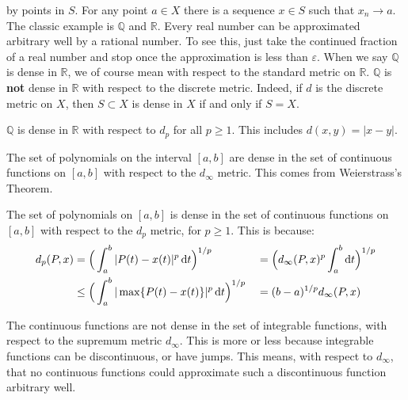         by points in $S$. For any point $a\in{X}$
        there is a sequence $x\in{S}$
        such that $x_{n}\rightarrow{a}$. The
        classic example is $\mathbb{Q}$ and
        $\mathbb{R}$. Every real number can be
        approximated arbitrary well by a rational
        number. To see this, just take the continued
        fraction of a real number and stop once
        the approximation is less than
        $\varepsilon$. When we say $\mathbb{Q}$ is
        dense in $\mathbb{R}$, we of course mean with
        respect to the standard metric on $\mathbb{R}$.
        $\mathbb{Q}$ is \textbf{not} dense in
        $\mathbb{R}$ with respect to the discrete metric.
        Indeed, if $d$ is the discrete metric on $X$,
        then $S\subset{X}$ is dense in $X$ if and only if
        $S=X$.
        \begin{example}
            $\mathbb{Q}$ is dense in $\mathbb{R}$
            with respect to $d_{p}$ for all
            $p\geq{1}$. This includes
            $d(x,y)=|x-y|$.
        \end{example}
        \begin{example}
            The set of polynomials on the interval
            $[a,b]$ are dense in the set of
            continuous functions on $[a,b]$ with
            respect to the $d_{\infty}$ metric.
            This comes from Weierstrass's Theorem.
        \end{example}
        \begin{example}
            The set of polynomials on $[a,b]$
            is dense in the set of continuous
            functions on $[a,b]$ with respect to
            the $d_{p}$ metric, for $p\geq{1}$. This
            is because:
            \begin{align*}
                d_{p}(P,x)&=
                \Big(
                    \int_{a}^{b}|P(t)-x(t)|^{p}\mathop{}\!\mathrm{d}{t}
                \Big)^{1/p}
                &
                &=\Big(
                    d_{\infty}(P,x)^{p}\int_{a}^{b}\mathop{}\!\mathrm{d}{t}
                \Big)^{1/p}\\
                &\leq\Big(\int_{a}^{b}
                    |\max\{P(t)-x(t)\}|^{p}\mathop{}\!\mathrm{d}{t}
                \Big)^{1/p}
                &
                &=(b-a)^{1/p}d_{\infty}(P,x)
            \end{align*}
        \end{example}
        \begin{example}
            The continuous functions are not dense
            in the set of integrable functions,
            with respect to the supremum metric
            $d_{\infty}$. This is more or less
            because integrable functions can
            be discontinuous, or have jumps. This
            means, with respect to $d_{\infty}$,
            that no continuous functions could
            approximate such a discontinuous function
            arbitrary well.
        \end{example}
